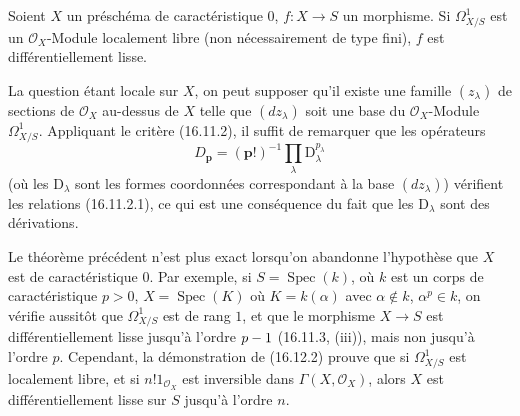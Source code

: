 \begin{theorem}[16.12.2]
\label{IV.16.12.2}
Soient $X$ un préschéma de caractéristique $0$, $f:X\to S$ un morphisme. Si
$\varOmega_{X/S}^1$ est un $\mathcal{O}_X$-Module localement libre (non
nécessairement de type fini), $f$ est différentiellement lisse.
\end{theorem}

La question étant locale sur $X$, on peut supposer qu'il existe une famille
$(z_\lambda)$ de sections de $\mathcal{O}_X$ au-dessus de $X$ telle que
$(dz_\lambda)$ soit une base du $\mathcal{O}_X$-Module $\varOmega_{X/S}^1$.
Appliquant le critère (16.11.2), il suffit de remarquer que les opérateurs
\[
  D_{\mathbf{p}}=(\mathbf{p}!)^{-1}
  \prod_\lambda \mathrm{D}_\lambda^{p_\lambda}
\]
(où les $\mathrm{D}_\lambda$ sont les formes coordonnées correspondant à la base
$(dz_\lambda)$) vérifient les relations (16.11.2.1), ce qui est une
conséquence du fait que les $\mathrm{D}_\lambda$ sont des dérivations.

\begin{env}[16.12.3]
\label{IV.16.12.3}
Le théorème précédent n'est plus exact lorsqu'on abandonne l'hypothèse que
$X$ est de caractéristique $0$. Par exemple, si
$S=\operatorname{Spec}(k)$, où $k$ est un corps de caractéristique $p>0$,
$X=\operatorname{Spec}(K)$ où $K=k(\alpha)$ avec
$\alpha\notin k$, $\alpha^p\in k$, on vérifie aussitôt
que $\varOmega_{X/S}^1$ est de rang $1$, et que le morphisme $X\to S$ est
différentiellement lisse jusqu'à l'ordre $p- 1$ (16.11.3, (iii)), mais non
jusqu'à l'ordre $p$. Cependant, la démonstration de (16.12.2) prouve que si
$\varOmega_{X/S}^1$ est localement libre, et si $n!1_{\mathcal{O}_X}$ est
inversible dans $\Gamma(X,\mathcal{O}_X)$, alors $X$ est différentiellement
lisse sur $S$ jusqu'à l'ordre $n$.
\end{env}
